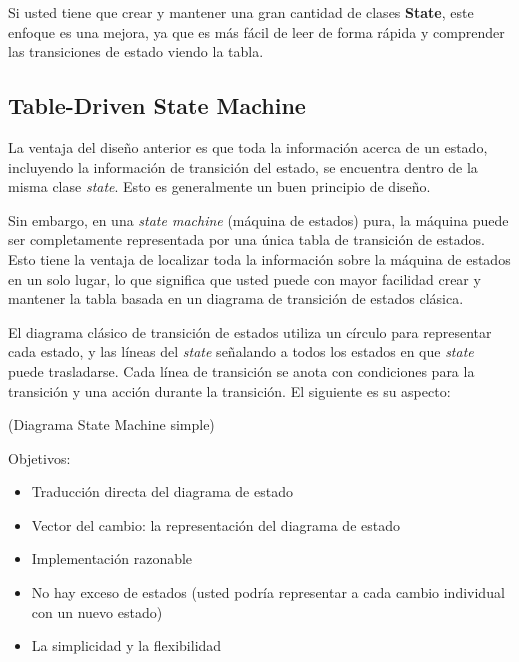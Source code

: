 Si usted tiene que crear y mantener una gran cantidad de clases \textbf{State}, este enfoque es una mejora, ya que es más fácil de leer de forma rápida y comprender las transiciones de estado viendo la tabla.

\newpage

\subsection*{Table-Driven State Machine}
\label{subsec:tdsm}

La ventaja del diseño anterior es que toda la información acerca de un estado, incluyendo la información de transición del estado,  se encuentra dentro de la misma clase \textit{state}. Esto es generalmente un buen principio de diseño.    \newline

Sin embargo, en una \textit{state machine} (máquina de estados) pura, la máquina puede ser completamente representada por una única tabla de transición de estados. Esto tiene la ventaja de localizar toda la información sobre la máquina de estados en un solo lugar, lo que significa que usted puede con mayor facilidad crear y mantener la tabla basada en un diagrama de transición de estados clásica.      \newline 

El diagrama clásico de transición de estados utiliza un círculo para representar cada estado, y las líneas del \textit{state} señalando a todos los estados en que \textit{state} puede trasladarse. Cada línea de transición se anota con condiciones para la transición y una acción durante la transición. El siguiente es su aspecto: \newline

(Diagrama State Machine simple) \newline

Objetivos:

\begin{itemize}
    \item Traducción directa del diagrama de estado
    \item Vector del cambio: la representación del diagrama de estado
    \item Implementación razonable
    \item No hay exceso de estados (usted podría representar a cada cambio individual con un nuevo estado)
    \item La simplicidad y la flexibilidad
\end{itemize}

